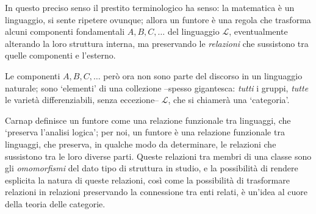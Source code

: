 \medskip
In questo preciso senso il prestito terminologico ha senso: la matematica è un linguaggio, si sente ripetere ovunque; allora un funtore è una regola che trasforma alcuni componenti fondamentali \(A,B,C,\dots\) del linguaggio \(\mathcal{L}\), eventualmente alterando la loro struttura interna, ma preservando le \emph{relazioni} che sussistono tra quelle componenti e l'esterno.
\begin{figure}
	\begin{center}
	\end{center}
	\caption{}
\end{figure}
Le componenti \(A,B,C,\dots\) però ora non sono parte del discorso in un linguaggio naturale; sono `elementi' di una collezione --spesso gigantesca: \emph{tutti} i gruppi, \emph{tutte} le varietà differenziabili, senza eccezione-- \(\mathcal{L}\), che si chiamerà una `categoria'.

Carnap definisce un funtore come una relazione funzionale tra linguaggi, che `preserva l'analisi logica'; per noi, un funtore è una relazione funzionale tra linguaggi, che preserva, in qualche modo da determinare, le relazioni che sussistono tra le loro diverse parti. Queste relazioni tra membri di una classe sono gli \emph{omomorfismi} del dato tipo di struttura in studio, e la possibilità di rendere esplicita la natura di queste relazioni, così come la possibilità di trasformare relazioni in relazioni preservando la connessione tra enti relati, è un'idea al cuore della teoria delle categorie.

